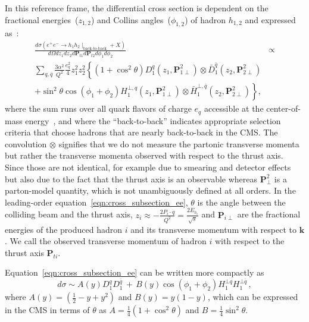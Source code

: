 In this reference frame, the differential cross section is dependent on the fractional energies~($z_{1,2}$) and Collins angles~($\phi_{1,2}$) of hadron $h_{1,2}$ and expressed as~\cite{BoerThesis}:
\begin{equation}
\begin{aligned}
\frac{d\sigma(e^+e^-\rightarrow h_1 h_2 \mid_{\text{back-to-back}} +X)}{d\Omega dz_1dz_2 d\boldsymbol{P}_{t1} d\boldsymbol{P}_{t2} d\phi_1d\phi_2}&\propto \\
\sum_{q,\bar{q}} \frac{3\alpha^2}{Q^2}\frac{e_q^2}{4}z^2_1z^2_2 \left\{ (1+\cos^2\theta)D_1^{q}(z_1,\boldsymbol{P}^2_{1\perp})\otimes\bar{D}_1^{\bar{q}}(z_2,\boldsymbol{P}^2_{2\perp})\right.\\  \left. +\sin^2\theta\cos(\phi_1+\phi_2)H_1^{\bot,q}(z_1,\boldsymbol{P}^2_{1\perp})\otimes\bar{H}_1^{\bot,\bar{q}}(z_2,\boldsymbol{P}^2_{2\perp})\right\},
\end{aligned}
\label{eqn:cross_subsection_ee}
\end{equation}
where the sum runs over all quark flavors of charge $e_q$ accessible at the center-of-mass energy~\cite{BoerThesis}, and where the ``back-to-back'' indicates appropriate selection criteria that choose hadrons that are nearly back-to-back in the CMS. The convolution $\otimes$ signifies that we do not measure the partonic transverse momenta but rather the transverse momenta observed with respect to the thrust axis. Since those are not identical, for example due to smearing and detector effects but also due to the fact that the thrust axis is an observable whereas $\boldsymbol{P}^2_{\perp}$ is a parton-model quantity, which is not unambiguously  defined at all orders. In the leading-order equation~\eqref{eqn:cross_subsection_ee},  $\theta$ is the angle between the colliding beam and the thrust axis, $z_i\approx -\frac{2P_{i}\cdot q}{Q^2}=\frac{2E_{h_i} }{\sqrt{s}}$ and $\boldsymbol{P}_{i\perp}$ are the fractional energies of the produced hadron $i$ and its transverse momentum with respect to $\boldsymbol{k}$. We call the observed transverse momentum of hadron $i$ with respect to the thrust axis $\boldsymbol{P}_{ti}$. %

Equation~\ref{eqn:cross_subsection_ee} can be written more compactly as
%
\begin{equation}
d\sigma \sim A(y) D_1^q {D}_1^{\bar{q}} \, + \, B(y) \cos(\phi_1+\phi_2)H^{\bot q}_{1}{H}^{\bot \bar{q} }_{1} \, ,
\label{eqn:FF2}
\end{equation}
% 
where $A(y)=(\frac{1}{2}-y+y^2)$ and $B(y)=y(1-y)$, which can be expressed in the CMS in terms of \(\theta\)  as $A=\frac{1}{4}(1+\cos^2\theta)$ and $B=\frac{1}{4}\sin^2\theta$. 


